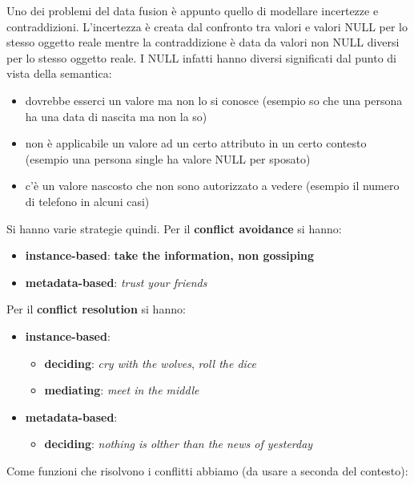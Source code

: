 \documentclass[a4paper,12pt, oneside]{book}
\begin{document}
Uno dei problemi del data fusion è appunto quello di modellare incertezze e
contraddizioni. L'incertezza è creata dal confronto tra valori e valori NULL per
lo stesso oggetto reale
mentre la contraddizione è data da valori non NULL diversi per lo stesso oggetto
reale. I NULL infatti hanno diversi significati dal punto di vista della
semantica:
\begin{itemize}
  \item dovrebbe esserci un valore ma non lo si conosce (esempio so che una
  persona ha una data di nascita ma non la so)
  \item non è applicabile un valore ad un certo attributo in un certo contesto
  (esempio una persona single ha valore NULL per sposato)
  \item c'è un valore nascosto che non sono autorizzato a vedere (esempio il
  numero di telefono in alcuni casi)
\end{itemize}
Si hanno varie strategie quindi. Per il \textbf{conflict avoidance} si hanno:
\begin{itemize}
  \item \textbf{instance-based}: \textbf{take the information, non gossiping}
  \item \textbf{metadata-based}: \textit{trust your friends}
\end{itemize}
Per il \textbf{conflict resolution} si hanno:
\begin{itemize}
  \item \textbf{instance-based}:
  \begin{itemize}
    \item \textbf{deciding}: \textit{cry with the wolves}, \textit{roll the
      dice}
    \item \textbf{mediating}: \textit{meet in the middle}
  \end{itemize}
  \item \textbf{metadata-based}:
   \begin{itemize}
    \item \textbf{deciding}: \textit{nothing is olther than the news of
      yesterday} 
  \end{itemize}
\end{itemize}
Come funzioni che risolvono i conflitti abbiamo (da usare a seconda del
contesto):
\end{document}
